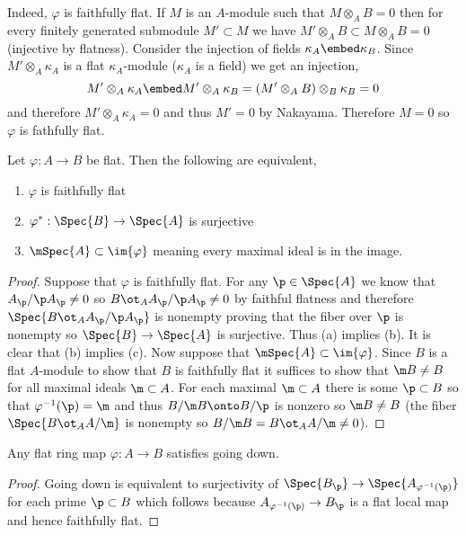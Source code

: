 \documentclass[12pt]{article}
\begin{document}
Indeed, $\varphi$ is faithfully flat. If $M$ is an $A$-module such that $M \otimes_A B = 0$ then for every finitely generated submodule $M' \subset M$ we have $M' \otimes_A B \subset M \otimes_A B = 0$ (injective by flatness). Consider the injection of fields $\kappa_A \embed \kappa_B$. Since $M ' \otimes_A \kappa_A$ is a flat $\kappa_A$-module ($\kappa_A$ is a field) we get an injection,
\[ M' \otimes_A \kappa_A \embed M' \otimes_A \kappa_B = (M' \otimes_A B) \otimes_B \kappa_B = 0 \]
and therefore $M' \otimes_A \kappa_A = 0$ and thus $M' = 0$ by Nakayama. Therefore $M = 0$ so $\varphi$ is fathfully flat. 

\begin{prop}
Let $\varphi : A \to B$ be flat. Then the following are equivalent,
\begin{enumerate}
\item $\varphi$ is faithfully flat
\item $\varphi^* : \Spec{B} \to \Spec{A}$ is surjective
\item $\mSpec{A} \subset \im{\varphi}$ meaning every maximal ideal is in the image.
\end{enumerate}
\end{prop}

\begin{proof}
Suppose that $\varphi$ is faithfully flat. For any $\p \in \Spec{A}$ we know that $A_\p / \p A_\p \neq 0$ so $B \ot_A A_\p / \p A_\p \neq 0$ by faithful flatness and therefore $\Spec{B \ot_A A_\p / \p A_\p}$ is nonempty proving that the fiber over $\p$ is nonempty so $\Spec{B} \to \Spec{A}$ is surjective. Thus (a) implies (b). It is clear that (b) implies (c). Now suppose that $\mSpec{A} \subset \im{\varphi}$. Since $B$ is a flat $A$-module to show that $B$ is faithfully flat it suffices to show that $\m B \neq B$ for all maximal ideals $\m \subset A$. For each maximal $\m \subset A$ there is some $\p \subset B$ so that $\varphi^{-1}(\p) = \m$ and thus $B / \m B \onto B / \p$ is nonzero so $\m B \neq B$ (the fiber $\Spec{B \ot_A A / \m}$ is nonempty so $B / \m B = B \ot_A A / \m \neq 0$). 
\end{proof}

\begin{prop}
Any flat ring map $\varphi : A \to B$ satisfies going down.
\end{prop}

\begin{proof}
Going down is equivalent to surjectivity of $\Spec{B_\p} \to \Spec{A_{\varphi^{-1}(\p)}}$ for each prime $\p \subset B$ which follows because $A_{\varphi^{-1}(\p)} \to B_\p$ is a flat local map and hence faithfully flat. 
\end{proof}
\end{document}
